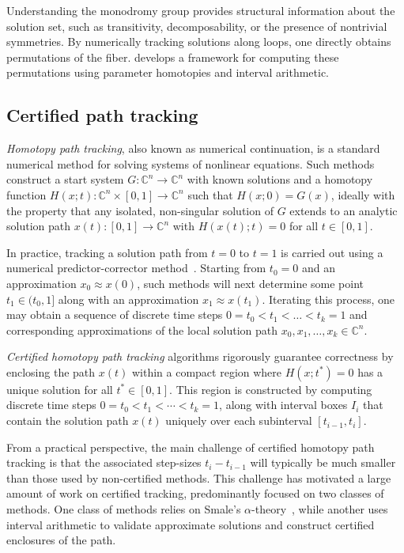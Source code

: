\documentclass[11pt]{amsart}
\let\oldtextit\textit
\renewcommand\emph[1]{\oldtextit{\color{blue}#1}}
\theoremstyle{definition}
\theoremstyle{remark}
\newcommand{\CC}{{\mathbb C}}
\begin{document}
Understanding the monodromy group provides structural information about the solution set, such as transitivity, decomposability, or the presence of nontrivial symmetries. By numerically tracking solutions along loops, one directly obtains permutations of the fiber.  develops a framework for computing these permutations using parameter homotopies and interval arithmetic.




\subsection{Certified path tracking}\label{subsec:certified-track} 
\emph{Homotopy path tracking}, also known as numerical continuation, is a standard numerical method for solving systems of nonlinear equations. 
Such methods construct a start system $G:\mathbb{C}^n \to \mathbb{C}^n$ with known solutions and a homotopy function $H(x;t): \mathbb{C}^n \times [0,1] \to \mathbb{C}^n$ such that $H(x;0) = G(x)$,  ideally with the property that any isolated, non-singular solution of $G$ extends to an analytic solution path $x(t) : [0,1] \to \CC^n$ with $H(x(t) ; t) = 0$ for all $t\in [0,1].$ 

In practice, tracking a solution path from $t = 0$ to $t = 1$ is carried out using a numerical predictor-corrector method~\cite[Chapter 2.3]{SommeseWampler:2005}. 
Starting from $t_0 =0$ and an approximation $x_0 \approx x(0)$, such methods will next determine some point $t_1 \in (t_0, 1]$ along with an approximation $x_1 \approx x(t_1)$. Iterating this process, one may obtain a sequence of discrete time steps $0 = t_0 < t_1 < \dots < t_k = 1$ and corresponding approximations of the local solution path $x_0, x_1, \dots, x_k\in \CC^n$.

\emph{Certified homotopy path tracking} algorithms rigorously guarantee correctness by enclosing the path $x(t)$ within a compact region where $H(x; t^*) = 0$ has a unique solution for all $t^* \in [0,1]$. This region is constructed by computing discrete time steps $0 = t_0 < t_1 < \cdots < t_k = 1$, along with interval boxes $I_i$ that contain the solution path $x(t)$ uniquely over each subinterval $[t_{i-1}, t_i]$.

From a practical perspective, the main challenge of certified homotopy path tracking is that the associated step-sizes $t_{i} - t_{i-1}$ will typically be much smaller than those used by non-certified methods.
This challenge has motivated a large amount of work on certified tracking, predominantly focused on two classes of methods. One class of methods \cite{beltran2012certified,beltran2013robust,hauenstein2014posteriori} relies on Smale’s $\alpha$-theory~\cite[Chapter 8]{blum1998complexity}, while another \cite{doi:10.1137/0731048,martin2013certified,van2011reliable,xu2018approach,duff2024certified,guillemot2024validated,guillemot2025certified} uses interval arithmetic to validate approximate solutions and construct certified enclosures of the path. 
\end{document}
